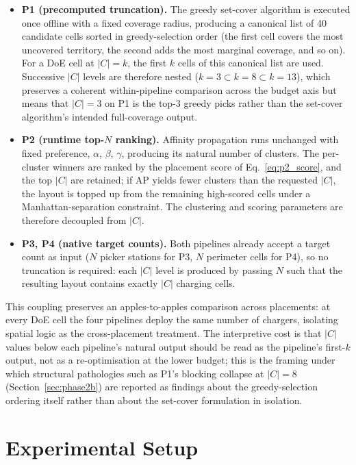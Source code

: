 \documentclass[conference]{IEEEtran}
\begin{document}
\begin{itemize}
  \item \textbf{P1 (precomputed truncation).} The greedy set-cover algorithm is executed once offline with a fixed coverage radius, producing a canonical list of 40 candidate cells sorted in greedy-selection order (the first cell covers the most uncovered territory, the second adds the most marginal coverage, and so on). For a DoE cell at $|C| = k$, the first $k$ cells of this canonical list are used. Successive $|C|$ levels are therefore nested ($k=3 \subset k=8 \subset k=13$), which preserves a coherent within-pipeline comparison across the budget axis but means that $|C|=3$ on P1 is the top-3 greedy picks rather than the set-cover algorithm's intended full-coverage output.

  \item \textbf{P2 (runtime top-$N$ ranking).} Affinity propagation runs unchanged with fixed preference, $\alpha$, $\beta$, $\gamma$, producing its natural number of clusters. The per-cluster winners are ranked by the placement score of Eq.~\eqref{eq:p2_score}, and the top $|C|$ are retained; if AP yields fewer clusters than the requested $|C|$, the layout is topped up from the remaining high-scored cells under a Manhattan-separation constraint. The clustering and scoring parameters are therefore decoupled from $|C|$.

  \item \textbf{P3, P4 (native target counts).} Both pipelines already accept a target count as input ($N$ picker stations for P3, $N$ perimeter cells for P4), so no truncation is required: each $|C|$ level is produced by passing $N$ such that the resulting layout contains exactly $|C|$ charging cells.
\end{itemize}

This coupling preserves an apples-to-apples comparison across placements: at every DoE cell the four pipelines deploy the same number of chargers, isolating spatial logic as the cross-placement treatment. The interpretive cost is that $|C|$ values below each pipeline's natural output should be read as the pipeline's first-$k$ output, not as a re-optimisation at the lower budget; this is the framing under which structural pathologies such as P1's blocking collapse at $|C| = 8$ (Section~\ref{sec:phase2b}) are reported as findings about the greedy-selection ordering itself rather than about the set-cover formulation in isolation.

\section{Experimental Setup}
\label{sec:experiments}
\end{document}
